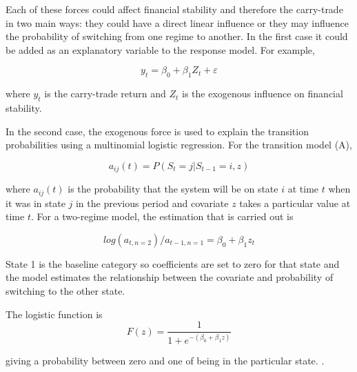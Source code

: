 \documentclass[12pt, a4paper, oneside]{article}\usepackage[]{graphicx}\usepackage[]{color}
\begin{document}
Each of these forces could affect financial stability and therefore the carry-trade in two main ways:  they could have a direct linear influence or they may influence the probability of switching from one regime to another.  In the first case it could be added as an explanatory variable to the response model. For example, 

\begin{equation}
\label{eqref:vix}
y_t = \beta_0 + \beta_1 Z_t + \varepsilon
\end{equation}

where $y_t$ is the carry-trade return and $Z_t$ is the exogenous influence on financial stability. 

In the second case, the exogenous force is used to explain the transition probabilities using a multinomial logistic regression. For the transition model (A), 

\begin{equation}
a_{ij}(t) = P(S_t = j|S_{t-1} = i, z)
\end{equation}

where $a_{ij}(t)$ is the probability that the system will be on state $i$ at time $t$ when it was in state $j$ in the previous period and covariate $z$ takes a particular value at time $t$.  For a two-regime model, the  estimation that is carried out is 

\begin{equation}
log(a_{t,n = 2})/ a_{t-1, n = 1} = \beta_{0} +\beta_1 z_t 
\end{equation}

State 1 is the baseline category so coefficients are set to zero for that state and the model estimates the relationship between the covariate and probability of switching to the other state. 

The logistic function is 
\begin{equation} 
F(z)  = \frac{1}{1 + e^{-(\beta_0 + \beta_1 z)}}
\label{eqref:zcov}
\end{equation}
 
giving a probability between zero and one of being in the particular state. \citet[pp.174-75]{agresti2014categorical}. 
\end{document}
